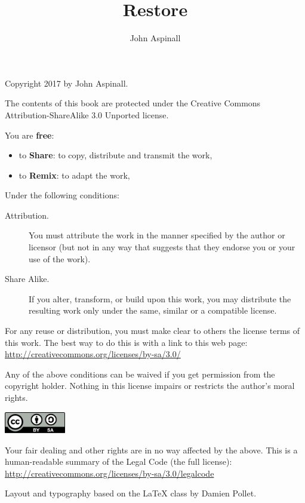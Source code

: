 \documentclass[10pt,twoside,english]{_support/latex/sbabook/sbabook}
\title{Restore}
\author{John Aspinall}
\begin{document}
\maketitle
\pagestyle{titlingpage}
\thispagestyle{titlingpage} %

\cleartoverso
{\small

  Copyright 2017 by John Aspinall.

  The contents of this book are protected under the Creative Commons
  Attribution-ShareAlike 3.0 Unported license.

  You are \textbf{free}:
  \begin{itemize}
  \item to \textbf{Share}: to copy, distribute and transmit the work,
  \item to \textbf{Remix}: to adapt the work,
  \end{itemize}

  Under the following conditions:
  \begin{description}
  \item[Attribution.] You must attribute the work in the manner specified by the
    author or licensor (but not in any way that suggests that they endorse you
    or your use of the work).
  \item[Share Alike.] If you alter, transform, or build upon this work, you may
    distribute the resulting work only under the same, similar or a compatible
    license.
  \end{description}

  For any reuse or distribution, you must make clear to others the
  license terms of this work. The best way to do this is with a link to
  this web page: \\
  \url{http://creativecommons.org/licenses/by-sa/3.0/}

  Any of the above conditions can be waived if you get permission from
  the copyright holder. Nothing in this license impairs or restricts the
  author's moral rights.

  \begin{center}
    \includegraphics[width=0.2\textwidth]{_support/latex/sbabook/CreativeCommons-BY-SA.pdf}
  \end{center}

  Your fair dealing and other rights are in no way affected by the
  above. This is a human-readable summary of the Legal Code (the full
  license): \\
  \url{http://creativecommons.org/licenses/by-sa/3.0/legalcode}

  \vfill

  Layout and typography based on the  \LaTeX{} class by Damien
  Pollet.
}
\end{document}

